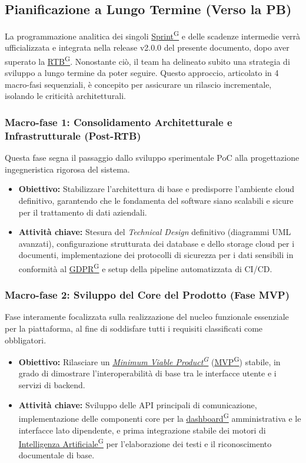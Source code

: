 \documentclass[a4paper,12pt]{article}
\providecommand{\glslink}[2]{\href{https://alittlebyte-19.github.io/Documentazione/glossario.html\#gls-#1}{\underline{#2}\textsuperscript{\scriptsize G}}}
\begin{document}
\subsection{Pianificazione a Lungo Termine (Verso la PB)}
La programmazione analitica dei singoli \glslink{sprint}{Sprint} e delle scadenze intermedie verrà ufficializzata e integrata nella release v2.0.0 del presente documento, dopo aver superato la \glslink{rtb-requirements-and-technology-baseline}{RTB}. Nonostante ciò, il team ha delineato subito una strategia di sviluppo a lungo termine da poter seguire. Questo approccio, articolato in 4 macro-fasi sequenziali, è concepito per assicurare un rilascio incrementale, isolando le criticità architetturali.

\subsubsection{Macro-fase 1: Consolidamento Architetturale e Infrastrutturale (Post-RTB)}
Questa fase segna il passaggio dallo sviluppo sperimentale PoC alla progettazione ingegneristica rigorosa del sistema.
\begin{itemize}
    \item \textbf{Obiettivo:} Stabilizzare l'architettura di base e predisporre l'ambiente cloud definitivo, garantendo che le fondamenta del software siano scalabili e sicure per il trattamento di dati aziendali.
    \item \textbf{Attività chiave:} Stesura del \textit{Technical Design} definitivo (diagrammi UML avanzati), configurazione strutturata dei database e dello storage cloud per i documenti, implementazione dei protocolli di sicurezza per i dati sensibili in conformità al \glslink{gdpr}{GDPR} e setup della pipeline automatizzata di CI/CD.
\end{itemize}

\subsubsection{Macro-fase 2: Sviluppo del Core del Prodotto (Fase MVP)}
Fase interamente focalizzata sulla realizzazione del nucleo funzionale essenziale per la piattaforma, al fine di soddisfare tutti i requisiti classificati come obbligatori.
\begin{itemize}
    \item \textbf{Obiettivo:} Rilasciare un \textit{\glslink{mvp-minimum-viable-product}{Minimum Viable Product}} (\glslink{mvp-minimum-viable-product}{MVP}) stabile, in grado di dimostrare l'interoperabilità di base tra le interfacce utente e i servizi di backend.
    \item \textbf{Attività chiave:} Sviluppo delle API principali di comunicazione, implementazione delle componenti core per la \glslink{dashboard}{dashboard} amministrativa e le interfacce lato dipendente, e prima integrazione stabile dei motori di \glslink{intelligenza-artificiale-ai}{Intelligenza Artificiale} per l'elaborazione dei testi e il riconoscimento documentale di base.
\end{itemize}
\end{document}
